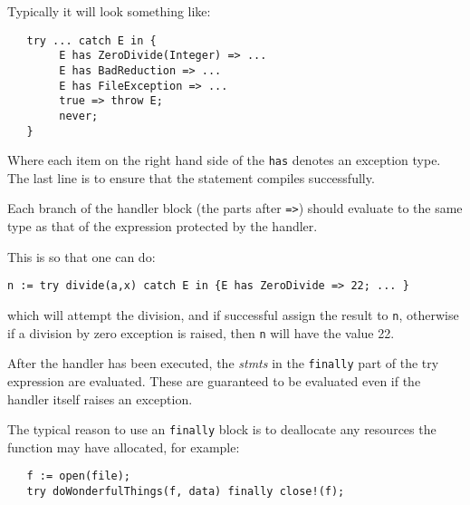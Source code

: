 Typically it will look something like:

\begin{small}
\begin{verbatim}
   try ... catch E in {
        E has ZeroDivide(Integer) => ...
        E has BadReduction => ...
        E has FileException => ...
        true => throw E;
        never;
   }
\end{verbatim}
\end{small}

Where each item on the right hand side of the {\tt has} denotes an
exception type.  The last line is to ensure that the statement
compiles successfully.

Each branch of the handler block (the parts after {\tt =>}) should
evaluate to the same type as that of the expression protected by the
handler.

This is so that one can do:

\begin{small}
\begin{verbatim}
n := try divide(a,x) catch E in {E has ZeroDivide => 22; ... }
\end{verbatim}
\end{small}

which will attempt the division, and if successful assign the result
to {\tt n}, otherwise if a division by zero exception is raised,
then {\tt n} will have the value 22.

After the handler has been executed, the {\em stmts} in the 
{\tt finally} part of the try expression are evaluated.  These are
guaranteed to be evaluated even if the handler itself raises an exception.

The typical reason to use an {\tt finally} block is to deallocate any
resources the function may have allocated, for example:

\begin{small}
\begin{verbatim}
   f := open(file);
   try doWonderfulThings(f, data) finally close!(f);
\end{verbatim}
\end{small}

